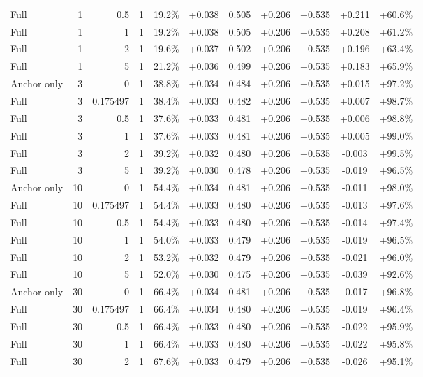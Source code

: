 \begin{table}[htbp]
\begin{tabular}{lrrrccccccc}
Full & 1 & 0.5 & 1 & 19.2\% & +0.038 & 0.505 & +0.206 & +0.535 & +0.211 & +60.6\% \\
Full & 1 & 1 & 1 & 19.2\% & +0.038 & 0.505 & +0.206 & +0.535 & +0.208 & +61.2\% \\
Full & 1 & 2 & 1 & 19.6\% & +0.037 & 0.502 & +0.206 & +0.535 & +0.196 & +63.4\% \\
Full & 1 & 5 & 1 & 21.2\% & +0.036 & 0.499 & +0.206 & +0.535 & +0.183 & +65.9\% \\
Anchor only & 3 & 0 & 1 & 38.8\% & +0.034 & 0.484 & +0.206 & +0.535 & +0.015 & +97.2\% \\
Full & 3 & 0.175497 & 1 & 38.4\% & +0.033 & 0.482 & +0.206 & +0.535 & +0.007 & +98.7\% \\
Full & 3 & 0.5 & 1 & 37.6\% & +0.033 & 0.481 & +0.206 & +0.535 & +0.006 & +98.8\% \\
Full & 3 & 1 & 1 & 37.6\% & +0.033 & 0.481 & +0.206 & +0.535 & +0.005 & +99.0\% \\
Full & 3 & 2 & 1 & 39.2\% & +0.032 & 0.480 & +0.206 & +0.535 & -0.003 & +99.5\% \\
Full & 3 & 5 & 1 & 39.2\% & +0.030 & 0.478 & +0.206 & +0.535 & -0.019 & +96.5\% \\
Anchor only & 10 & 0 & 1 & 54.4\% & +0.034 & 0.481 & +0.206 & +0.535 & -0.011 & +98.0\% \\
Full & 10 & 0.175497 & 1 & 54.4\% & +0.033 & 0.480 & +0.206 & +0.535 & -0.013 & +97.6\% \\
Full & 10 & 0.5 & 1 & 54.4\% & +0.033 & 0.480 & +0.206 & +0.535 & -0.014 & +97.4\% \\
Full & 10 & 1 & 1 & 54.0\% & +0.033 & 0.479 & +0.206 & +0.535 & -0.019 & +96.5\% \\
Full & 10 & 2 & 1 & 53.2\% & +0.032 & 0.479 & +0.206 & +0.535 & -0.021 & +96.0\% \\
Full & 10 & 5 & 1 & 52.0\% & +0.030 & 0.475 & +0.206 & +0.535 & -0.039 & +92.6\% \\
Anchor only & 30 & 0 & 1 & 66.4\% & +0.034 & 0.481 & +0.206 & +0.535 & -0.017 & +96.8\% \\
Full & 30 & 0.175497 & 1 & 66.4\% & +0.034 & 0.480 & +0.206 & +0.535 & -0.019 & +96.4\% \\
Full & 30 & 0.5 & 1 & 66.4\% & +0.033 & 0.480 & +0.206 & +0.535 & -0.022 & +95.9\% \\
Full & 30 & 1 & 1 & 66.4\% & +0.033 & 0.480 & +0.206 & +0.535 & -0.022 & +95.8\% \\
Full & 30 & 2 & 1 & 67.6\% & +0.033 & 0.479 & +0.206 & +0.535 & -0.026 & +95.1\% \\

\end{tabular}
\end{table}

